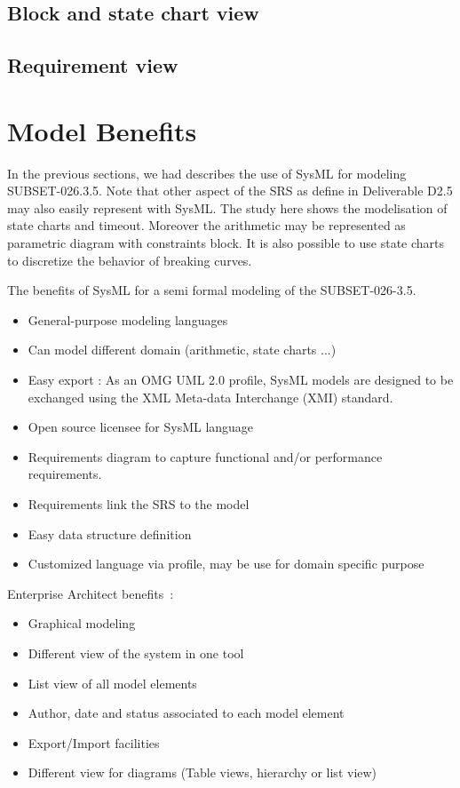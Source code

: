 \documentclass{template/openetcs_article}
\begin{document}
  \subsection{Block and state chart view}
  

  \subsection{Requirement view}
  

\section{Model Benefits}
\label{sec:model-highlights}

In the previous sections, we had describes the use of SysML for modeling
SUBSET-026.3.5. Note that other aspect of the SRS as define in Deliverable D2.5
may also easily represent with SysML. The study here shows the 
modelisation of state charts and timeout. Moreover the arithmetic may be
represented as parametric diagram with constraints block. It is also possible to
use state charts to discretize the behavior of breaking curves.



The benefits of SysML for a semi formal modeling of the SUBSET-026-3.5.
\begin{itemize}
\item General-purpose  modeling languages
\item Can model different domain (arithmetic, state charts ...)
\item Easy export : As an OMG UML 2.0 profile, SysML models are designed to be
exchanged using the XML Meta-data Interchange (XMI) standard.
\item Open source licensee for SysML language
\item Requirements diagram to capture functional and/or performance requirements.
\item Requirements link the SRS to the model
\item Easy data structure definition
\item Customized language via profile, may be use for domain specific purpose
\end{itemize}
Enterprise Architect benefits~:
\begin{itemize}
\item Graphical modeling
\item Different view of the system in one tool
\item List view of all model elements
\item Author, date and status associated to each model element
\item Export/Import facilities
\item Different view for diagrams (Table views,  hierarchy or list view)
\end{itemize}
\end{document}
